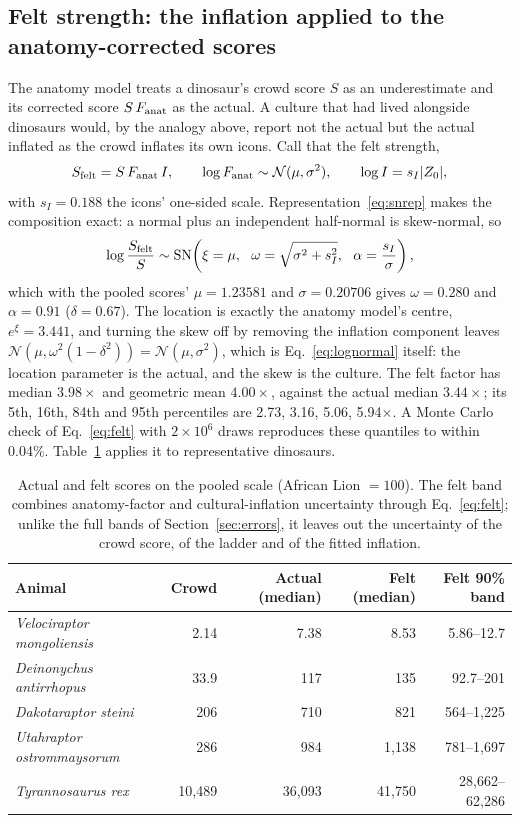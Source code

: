\documentclass[11pt]{article}
\begin{document}
\subsection{Felt strength: the inflation applied to the anatomy-corrected scores}
The anatomy model treats a dinosaur's crowd score $S$ as an underestimate and its corrected score $S\,F_{\rm anat}$ as the actual. A culture that had lived alongside dinosaurs would, by the analogy above, report not the actual but the actual inflated as the crowd inflates its own icons. Call that the felt strength,
\begin{equation}
S_{\rm felt}=S\,F_{\rm anat}\,I,\qquad \log F_{\rm anat}\sim\mathcal N(\mu,\sigma^2),\qquad \log I=s_I|Z_0| ,
\end{equation}
with $s_I=0.188$ the icons' one-sided scale. Representation~\eqref{eq:snrep} makes the composition exact: a normal plus an independent half-normal is skew-normal, so
\begin{equation}
\log\frac{S_{\rm felt}}{S}\sim\mathrm{SN}\!\left(\xi=\mu,\ \ \omega=\sqrt{\sigma^2+s_I^2},\ \ \alpha=\frac{s_I}{\sigma}\right),
\label{eq:felt}
\end{equation}
which with the pooled scores' $\mu=1.23581$ and $\sigma=0.20706$ gives $\omega=0.280$ and $\alpha=0.91$ ($\delta=0.67$). The location is exactly the anatomy model's centre, $e^{\xi}=3.441$, and turning the skew off by removing the inflation component leaves $\mathcal N(\mu,\omega^2(1-\delta^2))=\mathcal N(\mu,\sigma^2)$, which is Eq.~\eqref{eq:lognormal} itself: the location parameter is the actual, and the skew is the culture. The felt factor has median $3.98\times$ and geometric mean $4.00\times$, against the actual median $3.44\times$; its 5th, 16th, 84th and 95th percentiles are 2.73, 3.16, 5.06, 5.94$\times$. A Monte Carlo check of Eq.~\eqref{eq:felt} with $2\times10^6$ draws reproduces these quantiles to within 0.04\%. Table~\ref{tab:felt} applies it to representative dinosaurs.

\begin{table}[H]
\centering
\small
\begin{tabular}{lrrrr}
\toprule
Animal & Crowd & Actual (median) & Felt (median) & Felt 90\% band \\
\midrule
\textit{Velociraptor mongoliensis} & 2.14 & 7.38 & 8.53 & 5.86--12.7 \\
\textit{Deinonychus antirrhopus} & 33.9 & 117 & 135 & 92.7--201 \\
\textit{Dakotaraptor steini} & 206 & 710 & 821 & 564--1,225 \\
\textit{Utahraptor ostrommaysorum} & 286 & 984 & 1,138 & 781--1,697 \\
\textit{Tyrannosaurus rex} & 10,489 & 36,093 & 41,750 & 28,662--62,286 \\
\bottomrule
\end{tabular}
\caption{Actual and felt scores on the pooled scale (African Lion $=100$). The felt band combines anatomy-factor and cultural-inflation uncertainty through Eq.~\eqref{eq:felt}; unlike the full bands of Section~\ref{sec:errors}, it leaves out the uncertainty of the crowd score, of the ladder and of the fitted inflation.}
\label{tab:felt}
\end{table}
\end{document}
